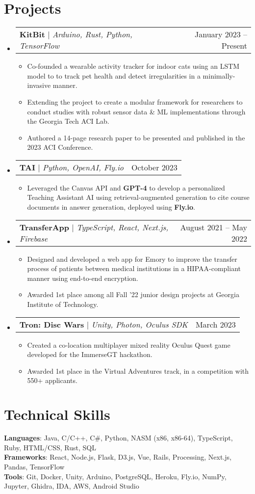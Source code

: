 \documentclass[letterpaper,11pt]{article}
\makeatletter
\newcommand{\resumeItem}[1]{
  \item\small{
    {#1 \vspace{-2pt}}
  }
}
\newcommand{\resumeProjectHeading}[2]{
    \item
    \begin{tabular*}{0.97\textwidth}{l@{\extracolsep{\fill}}r}
      \small#1 & #2 \\
    \end{tabular*}\vspace{-7pt}
}
\newcommand{\resumeSubHeadingListStart}{\begin{itemize}[leftmargin=0.15in, label={}]}
\newcommand{\resumeSubHeadingListEnd}{\end{itemize}}
\newcommand{\resumeItemListStart}{\begin{itemize}}
\newcommand{\resumeItemListEnd}{\end{itemize}\vspace{-5pt}}
\makeatother
\begin{document}
\section{Projects}
    \resumeSubHeadingListStart
    \resumeProjectHeading
          {\textbf{KitBit} $|$ \emph{Arduino, Rust, Python, TensorFlow}}{January 2023 -- Present}
          \resumeItemListStart
                      \resumeItem{Co-founded a wearable activity tracker for indoor cats using an LSTM model to to track pet health and detect irregularities in a minimally-invasive manner.}
                        \resumeItem{Extending the  project to create a modular framework for researchers to conduct studies with robust sensor data \& ML implementations through the Georgia Tech ACI Lab.}
            \resumeItem{Authored a 14-page research paper to be presented and published in the 2023 ACI Conference.}
          \resumeItemListEnd
      \resumeProjectHeading
          {\textbf{TAI} $|$ \emph{Python, OpenAI, Fly.io}}{October 2023}
          \resumeItemListStart
                      \resumeItem{Leveraged the Canvas API and \textbf{GPT-4} to develop a personalized Teaching Assistant AI using retrieval-augmented generation to cite course documents in answer generation, deployed using \textbf{Fly.io}.}
          \resumeItemListEnd
      \resumeProjectHeading
          {\textbf{TransferApp} $|$ \emph{TypeScript, React, Next.js, Firebase}}{August 2021 -- May 2022}
          \resumeItemListStart
            \resumeItem{Designed and developed a web app for Emory to improve the transfer process of patients between medical institutions in a HIPAA-compliant manner using end-to-end encryption.}
            \resumeItem{Awarded 1st place among all Fall ’22 junior design projects at Georgia Institute of Technology.}
          \resumeItemListEnd
      \resumeProjectHeading
          {\textbf{Tron: Disc Wars} $|$ \emph{Unity, Photon, Oculus SDK}}{March 2023}
          \resumeItemListStart
            \resumeItem{Created a co-location multiplayer mixed reality Oculus Quest game developed for the ImmerseGT hackathon.}
                        \resumeItem{Awarded 1st place in the Virtual Adventures track, in a competition with 550+ applicants.}
          \resumeItemListEnd
    \resumeSubHeadingListEnd



%
\section{Technical Skills}
 \begin{itemize}[leftmargin=0.15in, label={}]
    \small{\item{
     \textbf{Languages}{: Java, C/C++, C\#, Python, NASM (x86, x86-64), TypeScript, Ruby, HTML/CSS, Rust, SQL} \\
     \textbf{Frameworks}{: React, Node.js, Flask, D3.js, Vue, Rails, Processing, Next.js, Pandas, TensorFlow} \\
     \textbf{Tools}{: Git, Docker, Unity, Arduino, PostgreSQL, Heroku, Fly.io, NumPy, Jupyter, Ghidra, IDA, AWS, Android Studio} \\
    }}
 \end{itemize}


\end{document}
